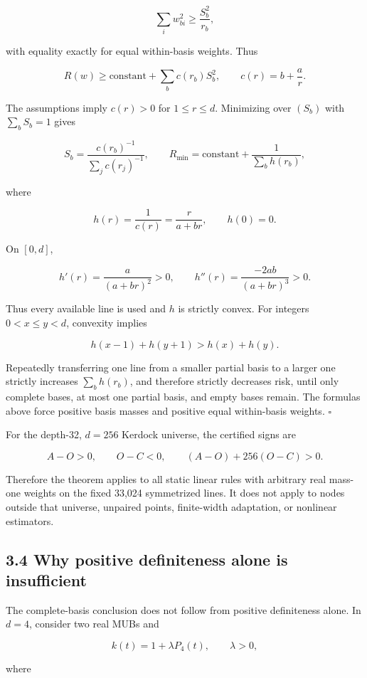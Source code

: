 \documentclass[
  10pt,
]{article}
\begin{document}
\[
\sum_iw_{bi}^2\ge \frac{S_b^2}{r_b},
\]

with equality exactly for equal within-basis weights. Thus

\[
R(w)\ge \text{constant}+\sum_b c(r_b)S_b^2,
\qquad
c(r)=b+\frac ar.
\]

The assumptions imply \(c(r)>0\) for \(1\le r\le d\). Minimizing over
\((S_b)\) with \(\sum_bS_b=1\) gives

\[
S_b=\frac{c(r_b)^{-1}}{\sum_j c(r_j)^{-1}},
\qquad
R_{\min}=\text{constant}+\frac1{\sum_b h(r_b)},
\]

where

\[
h(r)=\frac1{c(r)}=\frac{r}{a+br},\qquad h(0)=0.
\]

On \([0,d]\),

\[
h'(r)=\frac{a}{(a+br)^2}>0,
\qquad
h''(r)=\frac{-2ab}{(a+br)^3}>0.
\]

Thus every available line is used and \(h\) is strictly convex. For
integers \(0<x\le y<d\), convexity implies

\[
h(x-1)+h(y+1)>h(x)+h(y).
\]

Repeatedly transferring one line from a smaller partial basis to a
larger one strictly increases \(\sum_bh(r_b)\), and therefore strictly
decreases risk, until only complete bases, at most one partial basis,
and empty bases remain. The formulas above force positive basis masses
and positive equal within-basis weights. \(\square\)

For the depth-32, \(d=256\) Kerdock universe, the certified signs are

\[
A-O>0,
\qquad
O-C<0,
\qquad
(A-O)+256(O-C)>0.
\]

Therefore the theorem applies to all static linear rules with arbitrary
real mass-one weights on the fixed 33,024 symmetrized lines. It does not
apply to nodes outside that universe, unpaired points, finite-width
adaptation, or nonlinear estimators.

\subsection{3.4 Why positive definiteness alone is
insufficient}\label{why-positive-definiteness-alone-is-insufficient}

The complete-basis conclusion does not follow from positive definiteness
alone. In \(d=4\), consider two real MUBs and

\[
k(t)=1+\lambda P_4(t),\qquad \lambda>0,
\]

where
\end{document}
